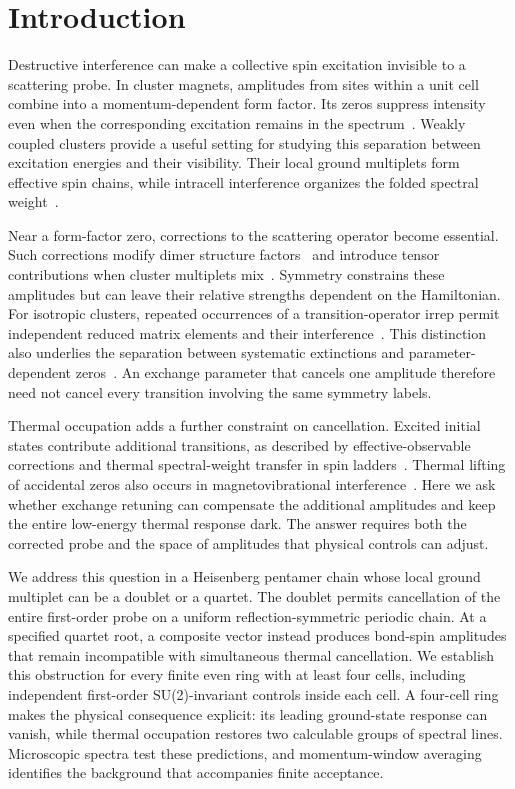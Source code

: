 \section{Introduction}

Destructive interference can make a collective spin excitation invisible
to a scattering probe. In cluster magnets, amplitudes from sites within
a unit cell combine into a momentum-dependent form factor.
Its zeros suppress intensity even when the corresponding excitation
remains in the spectrum~\cite{waldmann2003interference,haraldsen2011pentamer,tabrizi2021selection,tabrizi2021anisotropic}.
Weakly coupled clusters provide a useful setting for studying this
separation between excitation energies and their visibility.
Their local ground multiplets form effective spin chains, while
intracell interference organizes the folded spectral
weight~\cite{cheng2022trimer,li2026tetramer}.

Near a form-factor zero, corrections to the scattering operator become
essential. Such corrections modify dimer structure
factors~\cite{mueller2003structure} and introduce tensor contributions
when cluster multiplets mix~\cite{waldmann2005manyspin}.
Symmetry constrains these amplitudes but can leave their relative
strengths dependent on the Hamiltonian.
For isotropic clusters, repeated occurrences of a transition-operator
irrep permit independent reduced matrix elements and their
interference~\cite{tabrizi2021selection}.
This distinction also underlies the separation between systematic
extinctions and parameter-dependent zeros~\cite{tabrizi2026extinctions}.
An exchange parameter that cancels one amplitude therefore need not
cancel every transition involving the same symmetry labels.

Thermal occupation adds a further constraint on cancellation.
Excited initial states contribute additional
transitions, as described by effective-observable corrections and
thermal spectral-weight transfer in spin
ladders~\cite{exius2010vertex,honecker2016thermal}.
Thermal lifting of accidental zeros also occurs in magnetovibrational
interference~\cite{raymond2018interference}.
Here we ask whether exchange retuning can compensate the additional
amplitudes and keep the entire low-energy thermal response dark.
The answer requires both the corrected probe and the space of
amplitudes that physical controls can adjust.

We address this question in a Heisenberg pentamer chain whose local
ground multiplet can be a doublet or a quartet.
The doublet permits cancellation of the entire first-order probe on a
uniform reflection-symmetric periodic chain.
At a specified quartet root, a composite vector instead produces
bond-spin amplitudes that remain incompatible with simultaneous
thermal cancellation.
We establish this obstruction for every finite even ring with at least
four cells, including independent first-order SU(2)-invariant controls
inside each cell.
A four-cell ring makes the physical consequence explicit: its leading
ground-state response can vanish, while thermal occupation restores
two calculable groups of spectral lines.
Microscopic spectra test these predictions, and momentum-window
averaging identifies the background that accompanies finite acceptance.

